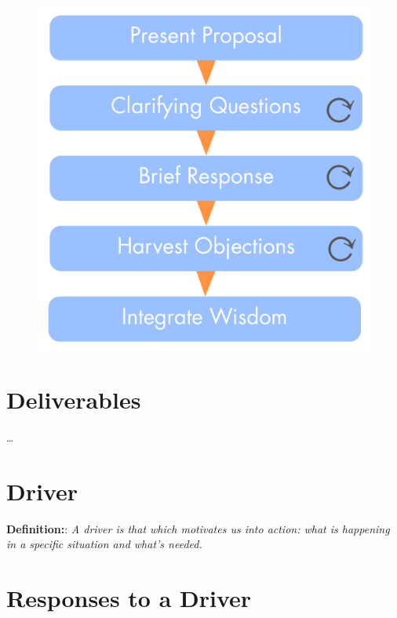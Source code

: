 \begin{figure}[htbp]
\centering
\includegraphics[keepaspectratio,width=\textwidth,height=0.75\textheight]{img/agreements/cdm-condensed.png}
\end{figure}

\section{Deliverables}
\label{deliverables}

{\ldots}

\section{Driver}
\label{driver}

\textbf{Definition:}: \emph{A driver is that which motivates us into action: what is happening in a specific situation and what’s needed.}

\section{Responses to a Driver}
\label{responsestoadriver}

